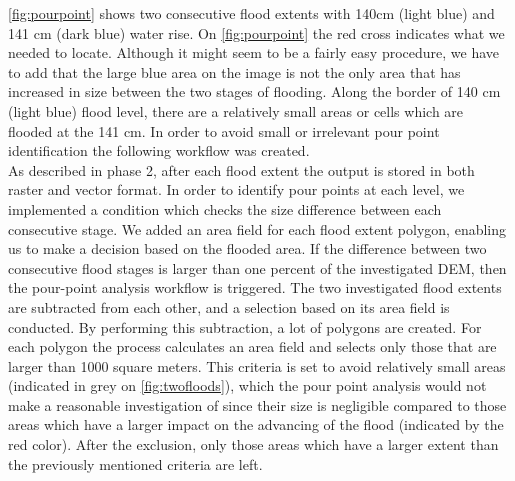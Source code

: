 \autoref{fig:pourpoint} shows two consecutive flood extents with 140cm (light blue) and 141 cm (dark blue) water rise. On \autoref{fig:pourpoint} the red cross indicates what we needed to locate. Although it might seem to be a fairly easy procedure, we have to add that the large blue area on the image is not the only area that has increased in size between the two stages of flooding. Along the border of 140 cm (light blue) flood level, there are a relatively small areas or cells  which are flooded at the 141 cm. In order to avoid small or irrelevant pour point identification the following workflow was created. \\

As described in phase 2, after each flood extent the output is stored in both raster and vector format. In order to identify pour points at each level, we implemented a condition which checks the size difference between each consecutive stage. We added an area field for each flood extent polygon, enabling us to make a decision based on the flooded area. If the difference between two consecutive flood stages is larger than one percent of the investigated DEM, then the pour-point analysis workflow is triggered. The two investigated flood extents are subtracted from each other, and a selection based on its area field is conducted. By performing this subtraction, a lot of polygons are created. For each polygon the process calculates an area field and selects only those that are larger than 1000 square meters. This criteria is set to avoid relatively small areas (indicated in grey on \autoref{fig:twofloods}), which the pour point analysis would not make a reasonable investigation of since their size is negligible compared to those areas which have a larger impact on the advancing of the flood (indicated by the red color). After the exclusion, only those areas which have a larger extent than the previously mentioned criteria are left.\\

